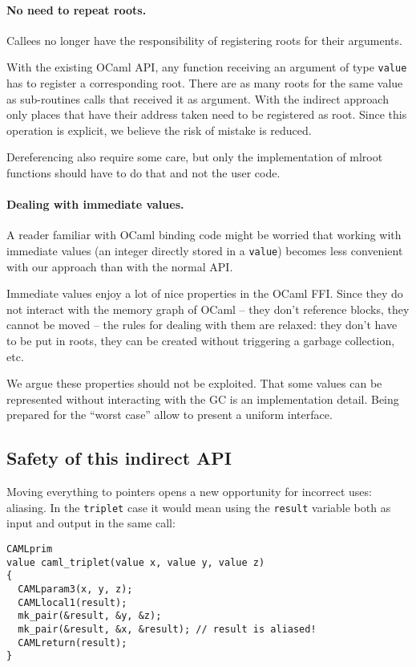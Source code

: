 \documentclass[a4paper]{easychair}
\newcommand{\cpp}[1]{\lstinline[style=C++]{#1}}
\begin{document}
\paragraph{No need to repeat roots.}

Callees no longer have the responsibility of registering roots for their arguments.

With the existing OCaml API, any function receiving an argument of type
\cpp{value} has to register a corresponding root. There are as many
roots for the same value as sub-routines calls that received it as
argument.  With the indirect approach only places that have their
address taken need to be registered as root. Since this operation is explicit,
we believe the risk of mistake is reduced.

Dereferencing also require some care, but only the implementation of mlroot
functions should have to do that and not the user code.

\paragraph{Dealing with immediate values.}

A reader familiar with OCaml binding code might be worried that working
with immediate values (an integer directly stored in a \cpp{value})
becomes less convenient with our approach than with the normal API.

Immediate values enjoy a lot of nice properties in the OCaml FFI. Since
they do not interact with the memory graph of OCaml -- they don't reference
blocks, they cannot be moved -- the rules for dealing with them are relaxed:
they don't have to be put in roots, they can be created without triggering a
garbage collection, etc.

We argue these properties should not be exploited. That some values can be
represented without interacting with the GC is an implementation detail. Being
prepared for the ``worst case'' allow to present a uniform interface.

\subsection{Safety of this indirect API}

Moving everything to pointers opens a new opportunity for incorrect
uses: aliasing. In the \cpp{triplet} case it would mean using the
\cpp{result} variable both as input and output in the same call:
%
\begin{lstlisting}[style=C++]
CAMLprim
value caml_triplet(value x, value y, value z)
{
  CAMLparam3(x, y, z);
  CAMLlocal1(result);
  mk_pair(&result, &y, &z);
  mk_pair(&result, &x, &result); // result is aliased!
  CAMLreturn(result);
}
\end{lstlisting}
\end{document}
